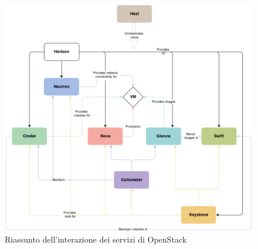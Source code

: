 \documentclass{article}
\begin{document}
\begin{figure}[H]
    \centering
    \includegraphics[scale=0.4]{img/openstack summary.png}
    \caption{Riassunto dell'interazione dei servizi di OpenStack}
\end{figure}\noindent
\end{document}
